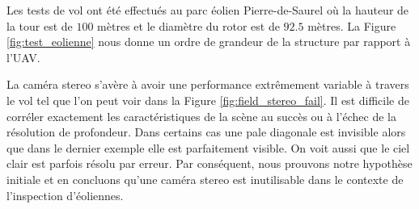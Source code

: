 Les tests de vol ont été effectués au parc éolien Pierre-de-Saurel où la hauteur de la tour est de $100$ mètres et le diamètre du rotor est de $92.5$ mètres. La Figure \ref{fig:test_eolienne} nous donne un ordre de grandeur de la structure par rapport à l'UAV.

%

La caméra stereo s'avère à avoir une performance extrêmement variable à travers le vol tel que l'on peut voir dans la Figure \ref{fig:field_stereo_fail}. Il est difficile de corréler exactement les caractéristiques de la scène au succès ou à l'échec de la résolution de profondeur. Dans certains cas une pale diagonale est invisible alors que dans le dernier exemple elle est parfaitement visible. On voit aussi que le ciel clair est parfois résolu par erreur. Par conséquent, nous prouvons notre hypothèse initiale et en concluons qu'une caméra stereo est inutilisable dans le contexte de l'inspection d'éoliennes.

